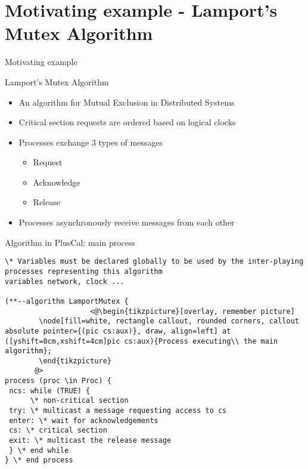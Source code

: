 \documentclass{beamer}
\begin{document}
\section{Motivating example - Lamport's Mutex Algorithm}

\begin{frame}[fragile]{Motivating example}

\begin{block}{Lamport's Mutex Algorithm}
\begin{itemize}
  \item An algorithm for Mutual Exclusion in Distributed Systems
  \item Critical section requests are ordered based on logical clocks
  \item Processes exchange 3 types of messages
  \begin{itemize} 
        \item Request
        \item Acknowledge
        \item Release
    \end{itemize}
   \item Processes asynchronously receive messages from each other
\end{itemize}
\end{block}
\end{frame}

\begin{frame}[fragile]{Algorithm in PlusCal: main process}
\begin{exampleblock}{}
\begin{lstlisting}[language=pluscal, frame = none, numbers = none]
\* Variables must be declared globally to be used by the inter-playing processes representing this algorithm
variables network, clock ...

(**--algorithm LamportMutex {
                    <@\begin{tikzpicture}[overlay, remember picture]
        \node[fill=white, rectangle callout, rounded corners, callout absolute pointer={(pic cs:aux)}, draw, align=left] at ([yshift=0cm,xshift=4cm]pic cs:aux){Process executing\\ the main algorithm};
        \end{tikzpicture}
       @>
process (proc \in Proc) {
 ncs: while (TRUE) {
      \* non-critical section
 try: \* multicast a message requesting access to cs
 enter: \* wait for acknowledgements 
 cs: \* critical section
 exit: \* multicast the release message
 } \* end while
} \* end process
\end{lstlisting}
\end{exampleblock}
\end{frame}
\end{document}
